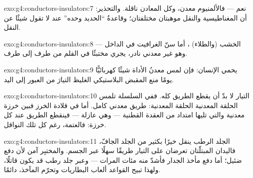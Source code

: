 \begin{solution}{exo:g4:conductors-insulators:7}
نعم --- فالألمنيوم معدن، وكل المعادن ناقلة. والتحذير: أن
المغناطيسية والنقل موهبتان مختلفتان؛ وقاعدةُ ``الحديد وحده''
عند  لا تقول شيئًا عن النقل.
\end{solution}

\begin{solution}{exo:g4:conductors-insulators:8}
الخشب (والطلاء) ، أما سنّ الغرافيت في الداخل  ---
وهو  غير معدني نادر، يجري مختبئًا في القلم من طرف إلى
طرف.
\end{solution}

\begin{solution}{exo:g4:conductors-insulators:9}
 يحمي الإنسان: فإن لمس معدنُ الأداة شيئًا كهربائيًّا يومًا
منع المقبض البلاستيكي الغليظ التيارَ من العبور إلى اليد.
\end{solution}

\begin{solution}{exo:g4:conductors-insulators:10}
التيار لا بدّ أن يقطع الطريق كله. ففي السلسلة تلمس الحلقة
المعدنية الحلقة المعدنية: طريق معدني كامل. أما في قلادة الخرز
فبين خرزة معدنية والتي تليها امتداد من العقدة القطنية ---
وهي عازلة --- فينقطع الطريق عند كل خرزة: فالعتمة، رغم كل تلك
النواقل.
\end{solution}

\begin{solution}{exo:g4:conductors-insulators:11}
الجلد الرطب ينقل خيرًا بكثير من الجلد الجافّ، فاليدان المبتلّتان
تعرضان على التيار طريقًا سهلًا عبر الجسم. والمختبِر 
آمن لأن دفع  ضئيل؛ أما دفع مأخذ الجدار فأشدّ منه مئات
المرات --- وعبر جلد رطب قد يكون قاتلًا، ولهذا تبيح القواعد
ألعاب البطاريات وتحرّم المآخذ، دائمًا.
\end{solution}
